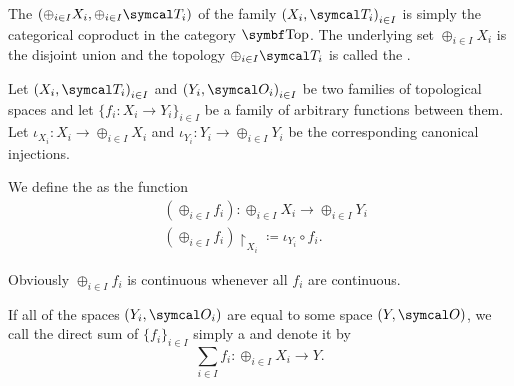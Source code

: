 \begin{definition}\label{def:topological_sum}\cite[74]{Engelking1989}
  The  \( (\oplus_{i \in I} X_i, \oplus_{i \in I} \Cal{T}_i) \) of the family \( { (X_i, \Cal{T}_i) }_{i \in I} \) is simply the categorical coproduct in the category \( \Cat{Top} \). The underlying set \( \oplus_{i \in I} X_i \) is the disjoint union and the topology \( \oplus_{i \in I} \Cal{T}_i \) is called the .

  Let \( { (X_i, \Cal{T}_i) }_{i \in I} \) and \( { (Y_i, \Cal{O}_i) }_{i \in I} \) be two families of topological spaces and let \( \{ f_i: X_i \to Y_i \}_{i \in I} \) be a family of arbitrary functions between them. Let \( \iota_{X_i}: X_i \to \oplus_{i \in I} X_i \) and \( \iota_{Y_i}: Y_i \to \oplus_{i \in I} Y_i \) be the corresponding canonical injections.

  We define the  as the function
  \begin{align*}
    &(\oplus_{i \in I} f_i): \oplus_{i \in I} X_i \to \oplus_{i \in I} Y_i \\
    &(\oplus_{i \in I} f_i){\restriction}_{X_i} \coloneqq \iota_{Y_i} \circ f_i.
  \end{align*}

  Obviously \( \oplus_{i \in I} f_i \) is continuous whenever all \( f_i \) are continuous.

  If all of the spaces \( (Y_i, \Cal{O}_i) \) are equal to some space \( (Y, \Cal{O}) \), we call the direct sum of \( \{ f_i \}_{i \in I} \) simply a  and denote it by
  \begin{equation*}
    \sum_{i \in I} f_i: \oplus_{i \in I} X_i \to Y.
  \end{equation*}
\end{definition}
